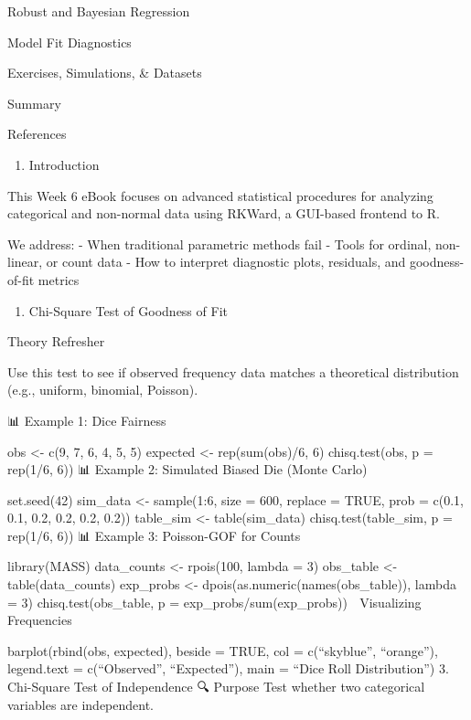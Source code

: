 \documentclass[
  letterpaper,
  DIV=11,
  numbers=noendperiod]{scrreprt}
\providecommand{\tightlist}{%
  \setlength{\itemsep}{0pt}\setlength{\parskip}{0pt}}
\begin{document}
Robust and Bayesian Regression

Model Fit Diagnostics

Exercises, Simulations, \& Datasets

Summary

References

\begin{enumerate}
\def\labelenumi{\arabic{enumi}.}
\tightlist
\item
  Introduction
\end{enumerate}

This Week 6 eBook focuses on advanced statistical procedures for
analyzing categorical and non-normal data using RKWard, a GUI-based
frontend to R.

We address: - When traditional parametric methods fail - Tools for
ordinal, non-linear, or count data - How to interpret diagnostic plots,
residuals, and goodness-of-fit metrics

\begin{enumerate}
\def\labelenumi{\arabic{enumi}.}
\setcounter{enumi}{1}
\tightlist
\item
  Chi-Square Test of Goodness of Fit
\end{enumerate}

Theory Refresher

Use this test to see if observed frequency data matches a theoretical
distribution (e.g., uniform, binomial, Poisson).

📊 Example 1: Dice Fairness

obs \textless- c(9, 7, 6, 4, 5, 5) expected \textless- rep(sum(obs)/6,
6) chisq.test(obs, p = rep(1/6, 6)) 📊 Example 2: Simulated Biased Die
(Monte Carlo)

set.seed(42) sim\_data \textless- sample(1:6, size = 600, replace =
TRUE, prob = c(0.1, 0.1, 0.2, 0.2, 0.2, 0.2)) table\_sim \textless-
table(sim\_data) chisq.test(table\_sim, p = rep(1/6, 6)) 📊 Example 3:
Poisson-GOF for Counts

library(MASS) data\_counts \textless- rpois(100, lambda = 3) obs\_table
\textless- table(data\_counts) exp\_probs \textless-
dpois(as.numeric(names(obs\_table)), lambda = 3) chisq.test(obs\_table,
p = exp\_probs/sum(exp\_probs)) 🎨 Visualizing Frequencies

barplot(rbind(obs, expected), beside = TRUE, col = c(``skyblue'',
``orange''), legend.text = c(``Observed'', ``Expected''), main = ``Dice
Roll Distribution'') 3. Chi-Square Test of Independence 🔍 Purpose Test
whether two categorical variables are independent.
\end{document}
